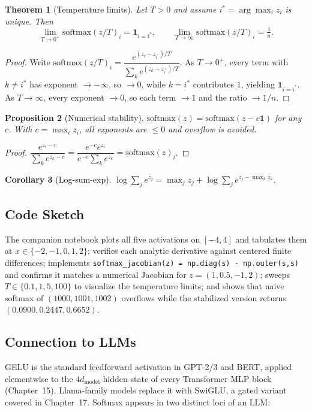 \documentclass[11pt]{article}
\newtheorem{theorem}{Theorem}[section]
\newtheorem{proposition}[theorem]{Proposition}
\newtheorem{corollary}[theorem]{Corollary}
\theoremstyle{remark}
\begin{document}
\begin{theorem}[Temperature limits]
Let $T>0$ and assume $i^* = \arg\max_i z_i$ is unique. Then
\[
\lim_{T\to 0^+} \mathrm{softmax}(z/T)_i = \mathbf{1}_{i=i^*}, \qquad \lim_{T\to\infty}\mathrm{softmax}(z/T)_i = \tfrac{1}{n}.
\]
\end{theorem}
\begin{proof}
Write $\mathrm{softmax}(z/T)_i = \dfrac{e^{(z_i - z_{i^*})/T}}{\sum_k e^{(z_k - z_{i^*})/T}}$. As $T\to 0^+$, every term with $k\ne i^*$ has exponent $\to-\infty$, so $\to 0$, while $k=i^*$ contributes $1$, yielding $\mathbf{1}_{i=i^*}$. As $T\to\infty$, every exponent $\to 0$, so each term $\to 1$ and the ratio $\to 1/n$.
\end{proof}

\begin{proposition}[Numerical stability]
$\mathrm{softmax}(z) = \mathrm{softmax}(z - c\mathbf{1})$ for any $c$. With $c = \max_i z_i$, all exponents are $\le 0$ and overflow is avoided.
\end{proposition}
\begin{proof}
$\dfrac{e^{z_i - c}}{\sum_k e^{z_k - c}} = \dfrac{e^{-c}e^{z_i}}{e^{-c}\sum_k e^{z_k}} = \mathrm{softmax}(z)_i$.
\end{proof}

\begin{corollary}[Log-sum-exp]
$\log\sum_j e^{z_j} = \max_j z_j + \log\sum_j e^{z_j - \max_k z_k}$.
\end{corollary}

\subsection*{Code Sketch}

The companion notebook plots all five activations on $[-4,4]$ and tabulates them at $x\in\{-2,-1,0,1,2\}$; verifies each analytic derivative against centered finite differences; implements \texttt{softmax\_jacobian(z) = np.diag(s) - np.outer(s,s)} and confirms it matches a numerical Jacobian for $z=(1,0.5,-1,2)$; sweeps $T\in\{0.1,1,5,100\}$ to visualize the temperature limits; and shows that naive softmax of $(1000,1001,1002)$ overflows while the stabilized version returns $(0.0900,0.2447,0.6652)$.

\subsection*{Connection to LLMs}

GELU is the standard feedforward activation in GPT-2/3 and BERT, applied elementwise to the $4d_{\text{model}}$ hidden state of every Transformer MLP block (Chapter~15). Llama-family models replace it with SwiGLU, a gated variant covered in Chapter~17. Softmax appears in two distinct loci of an LLM:
\end{document}
